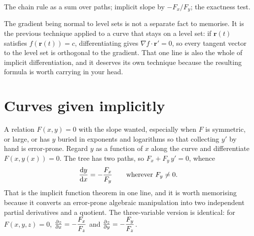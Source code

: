 \begin{seealsob}The chain rule as a sum over paths; implicit slope by $-F_{x}/F_{y}$; the exactness test.\end{seealsob}

The gradient being normal to level sets is not a separate fact to memorise. It is the previous technique applied to a curve that stays on a level set: if $\mathbf r(t)$ satisfies $f(\mathbf r(t))=c$, differentiating gives $\nabla f\cdot\mathbf r'=0$, so every tangent vector to the level set is orthogonal to the gradient. That one line is also the whole of implicit differentiation, and it deserves its own technique because the resulting formula is worth carrying in your head.

\section{Curves given implicitly}

\cue A relation $F(x,y)=0$ with the slope wanted, especially when $F$ is symmetric, or large, or has $y$ buried in exponents and logarithms so that collecting $y'$ by hand is error-prone.
\method Regard $y$ as a function of $x$ along the curve and differentiate $F(x,y(x))=0$. The tree has two paths, so $F_{x}+F_{y}\,y'=0$, whence
\[
\frac{\mathrm{d}y}{\mathrm{d}x}=-\frac{F_{x}}{F_{y}}\qquad\text{wherever }F_{y}\neq0 .
\]
That is the implicit function theorem in one line, and it is worth memorising because it converts an error-prone algebraic manipulation into two independent partial derivatives and a quotient. The three-variable version is identical: for $F(x,y,z)=0$, $\frac{\partial z}{\partial x}=-\dfrac{F_{x}}{F_{z}}$ and $\frac{\partial z}{\partial y}=-\dfrac{F_{y}}{F_{z}}$.

